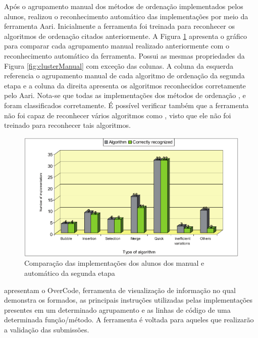 	    Após o agrupamento manual dos métodos de ordenação implementados pelos alunos,
	     realizou o reconhecimento automático das
	    implementações por meio da ferramenta Aari. Inicialmente a ferramenta foi
	    treinada para reconhecer os algoritmos de ordenação citados anteriormente.
	    A Figura \ref{fig:clusterAutomatico} apresenta o gráfico para comparar cada
	    agrupamento manual realizado anteriormente com o reconhecimento automático
	    da ferramenta. Possui as mesmas propriedades da Figura \ref{fig:clusterManual}
	    com exceção das colunas. A coluna da esquerda referencia o agrupamento manual
	    de cada algoritmo de ordenação da segunda etapa e a coluna da direita apresenta
	    os algoritmos reconhecidos corretamente pelo Aari. Nota-se que todas as
	    implementações dos métodos de ordenação ,
	     e  foram classificados corretamente.
	    É possível verificar também que a ferramenta não foi capaz de reconhecer vários
	    algoritmos como , visto que ele não foi treinado para
	    reconhecer tais algoritmos.
	    
	    \begin{figure}[ht]
	        \centering
	        \includegraphics[scale=0.33]{imagem/clusterAutomatico.png}
	        \captionsetup{justification=centering}
	        \caption{Comparação das implementações dos alunos dos 
	        	manual e automático da segunda etapa}
	        \label{fig:clusterAutomatico}
	    \end{figure}
	    
	     apresentam o OverCode, ferramenta de visualização
	    de informação no qual demonstra os  formados, as principais
	    instruções utilizadas pelas implementações presentes em um determinado
	    agrupamento e as linhas de código de uma determinada função/método. A
	    ferramenta é voltada para aqueles que realizarão a validação das submissões.
	    
